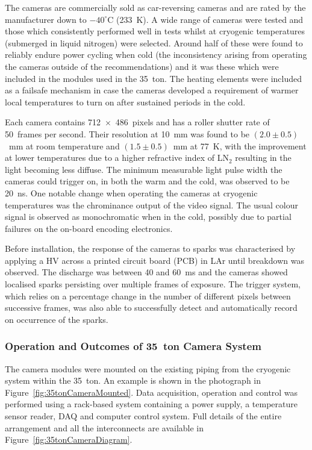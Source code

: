 The cameras are commercially sold as car-reversing cameras and are rated by the manufacturer down to $-40^{\circ}$C (233~K).  A wide range of cameras were tested and those which consistently performed well in tests whilst at cryogenic temperatures (submerged in liquid nitrogen) were selected.  Around half of these were found to reliably endure power cycling when cold (the inconsistency arising from operating the cameras outside of the recommendations) and it was these which were included in the modules used in the 35~ton.  The heating elements were included as a failsafe mechanism in case the cameras developed a requirement of warmer local temperatures to turn on after sustained periods in the cold.

Each camera contains 712~$\times$~486~pixels and has a roller shutter rate of 50~frames per second.  Their resolution at 10~mm was found to be $(2.0\pm0.5)$~mm at room temperature and $(1.5\pm0.5)$~mm at 77~K, with the improvement at lower temperatures due to a higher refractive index of LN$_2$ resulting in the light becoming less diffuse.  The minimum measurable light pulse width the cameras could trigger on, in both the warm and the cold, was observed to be 20~ns.  One notable change when operating the cameras at cryogenic temperatures was the chrominance output of the video signal.  The usual colour signal is observed as monochromatic when in the cold, possibly due to partial failures on the on-board encoding electronics.

Before installation, the response of the cameras to sparks was characterised by applying a HV across a printed circuit board (PCB) in LAr until breakdown was observed.  The discharge was between 40 and 60~ms and the cameras showed localised sparks persisting over multiple frames of exposure.  The trigger system, which relies on a percentage change in the number of different pixels between successive frames, was also able to successfully detect and automatically record on occurrence of the sparks.

\subsubsection{Operation and Outcomes of 35~ton Camera System}\label{sec:35tonCameraSystemOperation}

The camera modules were mounted on the existing piping from the cryogenic system within the 35~ton.  An example is shown in the photograph in Figure~\ref{fig:35tonCameraMounted}.  Data acquisition, operation and control was performed using a rack-based system containing a power supply, a temperature sensor reader, DAQ and computer control system.  Full details of the entire arrangement and all the interconnects are available in Figure~\ref{fig:35tonCameraDiagram}.

